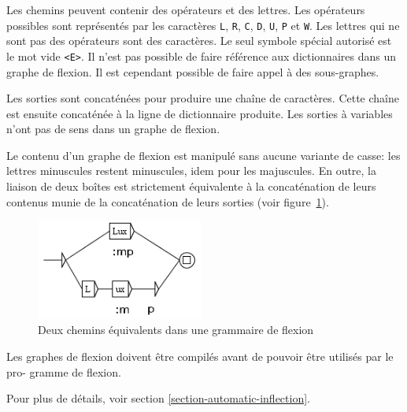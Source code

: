 \noindent Les chemins peuvent contenir des opérateurs et des lettres. Les opérateurs possibles
sont représentés par les caractères \verb+L+, \verb+R+, \verb+C+, \verb+D+, \verb+U+, \verb+P+ et
\verb+W+.
Les lettres qui ne sont pas des opérateurs sont des caractères. Le seul symbole spécial autorisé est
le mot vide \verb+<E>+. Il n’est pas possible de faire référence aux dictionnaires
dans un graphe de flexion. Il est cependant possible de
faire appel à des sous-graphes.

\bigskip
\noindent Les sorties sont concaténées pour produire une chaîne de caractères. Cette chaîne est
ensuite concaténée à la ligne de dictionnaire produite. Les sorties à variables n’ont pas de
sens dans un graphe de flexion.


\bigskip
\noindent Le contenu d’un graphe de flexion est manipulé sans aucune variante de casse: les lettres
minuscules restent minuscules, idem pour les majuscules. En outre, la liaison de deux boîtes
est strictement équivalente à la concaténation de leurs contenus munie de la concaténation
de leurs sorties (voir figure~\ref{fig-equivalent-inflection-paths}).

\bigskip
\begin{figure}[!h]
\begin{center}
\includegraphics[width=5.5cm]{resources/img/fig6-2.png}
\caption{Deux chemins équivalents dans une grammaire de flexion\label{fig-equivalent-inflection-paths}}
\end{center}
\end{figure}

\bigskip
\noindent Les graphes de flexion doivent être compilés avant de pouvoir être utilisés par le pro-
gramme de flexion.


\bigskip
\noindent Pour plus de détails, voir section
\ref{section-automatic-inflection}.

